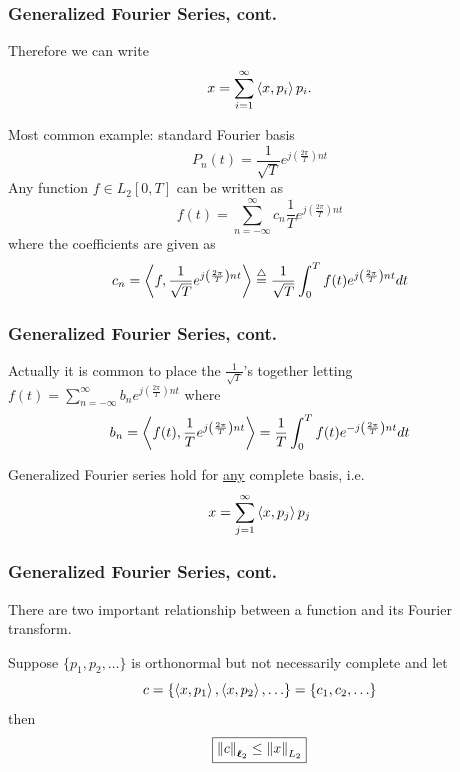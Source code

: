 \documentclass{beamer}
\begin{document}
\begin{frame}\frametitle{Generalized Fourier Series, cont.}
	Therefore we can write
	\[ 
	x = \sum_{i=1}^{\infty} \left<x,p_i \right>p_i.
	\]	
	
	\vfill
	
	Most common example:  standard Fourier basis
	\[ P_n(t) = \frac{1}{\sqrt{T}}e^{j \left(\frac{2\pi}{T}\right)n t} \]
	Any function $f \in L_2[0,T]$ can be written as
	\[ f(t) = \sum_{n=-\infty}^{\infty}c_n \frac{1}{T}
	e^{j\left(\frac{2\pi}{T}\right)nt} \]
	where the coefficients are given as
	\[ c_n = \left<f,\frac{1}{\sqrt{T}}e^{j\left(\frac{2\pi}{T}\right)nt} \right> \stackrel{\triangle}{=}
	\frac{1}{\sqrt{T}}\int_{0}^{T}f(t)e^{j\left(\frac{2\pi}{T}\right)nt}dt \]

\end{frame}

\begin{frame}\frametitle{Generalized Fourier Series, cont.}
	Actually it is common to place the $\frac{1}{\sqrt{T}}$'s together
	letting $f(t) = \sum_{n=-\infty}^{\infty} b_n e^{j\left(\frac{2\pi}{T}\right)nt}$ where
	\[ b_n = \left<f(t), \frac{1}{T}e^{j\left(\frac{2\pi}{T}\right)nt} \right> =
	\frac{1}{T}\int_0^{T}f(t) e^{-j\left(\frac{2\pi}{T}\right)nt}dt \]
	
	Generalized Fourier series hold for \underline{any} complete basis,
	i.e.
	\[ x = \sum_{j=1}^{\infty} \left<x,p_j \right>p_j \]
	
\end{frame}

\begin{frame}\frametitle{Generalized Fourier Series, cont.}
	There are two important relationship between a function and its
	Fourier transform.
	
	\begin{theorem}
	Suppose $\{p_1,p_2,\ldots\}$ is orthonormal but not necessarily
	complete and let 
	\[ c = \{ \left<x,p_1 \right>,\left<x,p_2 \right>, \ldots \} = \{c_1,c_2,\ldots
	\}\]
	then
	\[ \fbox{$\left\|c \right\|_{\boldsymbol{\ell}_2} \leq \left\|x \right\|_{L_2}$} \]
	\end{theorem}

\end{frame}
\end{document}
